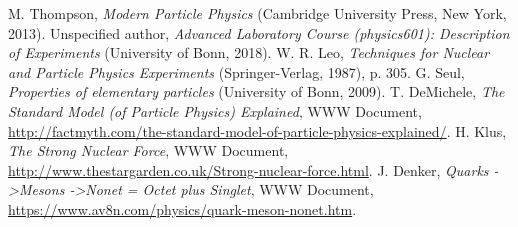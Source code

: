 \documentclass[twocolumn]{article}
\begin{document}
\begin{thebibliography}{9}
M. Thompson, \textsl{Modern Particle Physics} (Cambridge University Press, New York, 2013).
Unspecified author, \textsl{Advanced Laboratory Course (physics601): Description of Experiments} (University of Bonn, 2018).
W. R. Leo, \textsl{Techniques for Nuclear and Particle Physics Experiments} (Springer-Verlag, 1987), p. 305.
G. Seul, \textsl{Properties of elementary particles} (University of Bonn, 2009).
T. DeMichele, \textit{The Standard Model (of Particle Physics) Explained}, WWW Document, \url{http://factmyth.com/the-standard-model-of-particle-physics-explained/}.
H. Klus, \textit{The Strong Nuclear Force}, WWW Document, \url{http://www.thestargarden.co.uk/Strong-nuclear-force.html}.
J. Denker, \textit{Quarks -\textgreater Mesons -\textgreater Nonet = Octet plus Singlet}, WWW Document, \url{https://www.av8n.com/physics/quark-meson-nonet.htm}.

\iffalse
\bibitem{book}
K. Siegbahn, \textsl{Alpha-, beta-, and gamma-ray spectroscopy, Vol. 2} (North Holland Publishing Company, Amsterdam, 1965).
 \bibitem{link}
 W. U. Boeglin, \textit{Scintillation Detectors}, WWW Document, \url{http://wanda.fiu.edu/teaching/courses/Modern_lab_manual/scintillator.html}.
\bibitem{pdf_on_website}
Unspecified author, \textsl{Gamma Ray Spectroscopy} (University of Florida, 2013), \url{https://www.phys.ufl.edu/courses/phy4803L/group_I/gamma_spec/gamspec.pdf}.
\bibitem{cfd}
E. Ermis and C. Celiktas, International Journal Of Instrumentation Science 1, (2013), pp.54-62.
\bibitem{signal}
M. Nakhostin, \textsl{Signal Processing for Radiation Detectors} (John Wiley $\&$ Sons, 2018), p. 298\footnote{Relevant pages (chapter 6) available for preview under\\ \url{https://books.google.de/books?id=Lrg4DwAAQBAJ}}.
\bibitem{meliss}
A. C. Melissinos, J. Napolitano, \textsl{Experiments in Modern Physics, 2\textsuperscript{nd} edition} (Academic Press, San Diego, 2003), pp 419-21.
\fi
\end{thebibliography}
\end{document}
